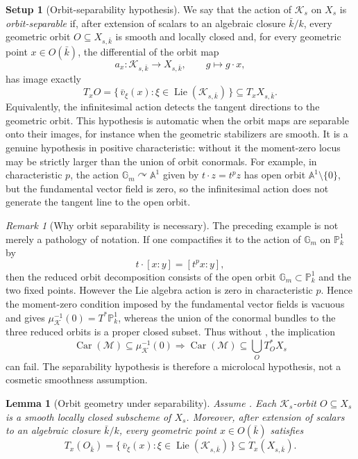 \documentclass[11pt]{amsart}
\theoremstyle{plain}
\newtheorem{lemma}{Lemma}[section]
\theoremstyle{definition}
\newtheorem{setup}{Setup}[section]
\theoremstyle{remark}
\newtheorem{remark}{Remark}[section]
\newcommand{\Car}{\operatorname{Car}}
\newcommand{\Lie}{\operatorname{Lie}}
\begin{document}
\begin{setup}[Orbit-separability hypothesis]
\label{hyp:orbit-separability}
We say that the action of \(\mathcal K_s\) on \(X_s\) is \emph{orbit-separable}
if, after extension of scalars to an algebraic closure \(\bar k/k\), every
geometric orbit \(O\subseteq X_{s,\bar k}\) is smooth and locally closed and, for
every geometric point \(x\in O(\bar k)\), the differential of the orbit map
\[
  a_x:\mathcal K_{s,\bar k}\longrightarrow X_{s,\bar k},
  \qquad g\longmapsto g\cdot x,
\]
has image exactly
\[
  T_xO
  =
  \{\,\bar v_\xi(x):\xi\in\Lie(\mathcal K_{s,\bar k})\,\}
  \subseteq T_xX_{s,\bar k}.
\]
Equivalently, the infinitesimal action detects the tangent directions to the
geometric orbit.  This hypothesis is automatic when the orbit maps are
separable onto their images, for instance when the geometric stabilizers are
smooth.  It is a genuine hypothesis in positive characteristic: without it the
moment-zero locus may be strictly larger than the union of orbit conormals.
For example, in characteristic \(p\), the action
\(\mathbb G_m\curvearrowright\mathbb A^1\) given by
\(t\cdot z=t^p z\) has open orbit \(\mathbb A^1\setminus\{0\}\), but the
fundamental vector field is zero, so the infinitesimal action does not generate
the tangent line to the open orbit.
\end{setup}

\begin{remark}[Why orbit separability is necessary]
\label{rem:separability-shield}
The preceding example is not merely a pathology of notation.  If one compactifies
it to the action of \(\mathbb G_m\) on \(\mathbb P^1_k\) by
\[
  t\cdot [x:y]=[t^p x:y],
\]
then the reduced orbit decomposition consists of the open orbit
\(\mathbb G_m\subset \mathbb P^1_k\) and the two fixed points.  However the
Lie algebra action is zero in characteristic \(p\).  Hence the moment-zero
condition imposed by the fundamental vector fields is vacuous and gives
\(\mu_{\mathcal K}^{-1}(0)=T^*\mathbb P^1_k\), whereas the union of the
conormal bundles to the three reduced orbits is a proper closed subset.  Thus
without , the implication
\[
  \Car(\mathcal M)\subseteq\mu_{\mathcal K}^{-1}(0)
  \Longrightarrow
  \Car(\mathcal M)\subseteq\bigcup_O T_O^*X_s
\]
can fail.  The separability hypothesis is therefore a microlocal hypothesis,
not a cosmetic smoothness assumption.
\end{remark}

\begin{lemma}[Orbit geometry under separability]
\label{lem:orbit-geometry}
Assume .  Each \(\mathcal K_s\)-orbit
\(O\subseteq X_s\) is a smooth locally closed subscheme of \(X_s\).  Moreover,
after extension of scalars to an algebraic closure \(\bar k/k\), every geometric
point \(x\in O(\bar k)\) satisfies
\[
  T_x(O_{\bar k})
  =
  \{\,\bar v_\xi(x):\xi\in\Lie(\mathcal K_{s,\bar k})\,\}
  \subseteq T_x(X_{s,\bar k}).
\]
\end{lemma}
\end{document}
